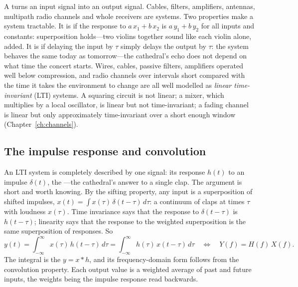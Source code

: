 A  turns an input signal into an output signal. Cables, filters, amplifiers,
antennas, multipath radio channels and whole receivers are systems. Two properties make a system
tractable. It is  if the response to $a\,x_1+b\,x_2$ is $a\,y_1+b\,y_2$ for all inputs
and constants: superposition holds---two violins together sound like each violin alone, added. It is
 if delaying the input by $\tau$ simply delays the output by $\tau$: the system
behaves the same today as tomorrow---the cathedral's echo does not depend on what time the concert
starts. Wires, cables, passive filters, amplifiers operated well below compression, and radio
channels over intervals short compared with the time it takes the environment to change are all
well modelled as \emph{linear time-invariant} (LTI) systems. A squaring circuit is not linear; a
mixer, which multiplies by a local oscillator, is linear but not time-invariant; a fading channel is
linear but only approximately time-invariant over a short enough window (Chapter~\ref{ch:channels}).

\subsection{The impulse response and convolution}

An LTI system is completely described by one signal: its response $h(t)$ to an impulse
$\delta(t)$, the ---the cathedral's answer to a single clap. The argument
is short and worth knowing. By the sifting property, any input is a superposition of shifted
impulses, $x(t)=\int x(\tau)\,\delta(t-\tau)\,d\tau$: a continuum of claps at times $\tau$ with
loudness $x(\tau)$. Time invariance says that the response to $\delta(t-\tau)$ is $h(t-\tau)$;
linearity says that the response to the weighted superposition is the same superposition of
responses. So
\begin{equation}
y(t)=\int_{-\infty}^{\infty}x(\tau)\,h(t-\tau)\,d\tau
=\int_{-\infty}^{\infty}h(\tau)\,x(t-\tau)\,d\tau
\quad\Longleftrightarrow\quad Y(f)=H(f)\,X(f).
\label{eq:ch02:conv}
\end{equation}
The integral is the  $y=x*h$, and its frequency-domain form follows from the
convolution property. Each output value is a weighted average of past and future inputs, the
weights being the impulse response read backwards.


